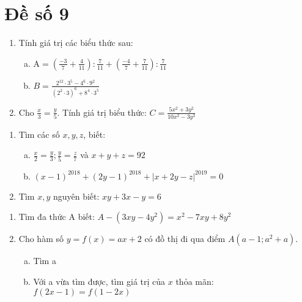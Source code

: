 \onehalfspacing
\section{Đề số 9}

\begin{bt}
	\hfill
	\begin{enumerate}[1.]
		\item Tính giá trị các biểu thức sau:
		\begin{enumerate}[a.]
			\item $\mathrm{A}=\left(\frac{-3}{7}+\frac{4}{11}\right): \frac{7}{11}+\left(\frac{-4}{7}+\frac{7}{11}\right): \frac{7}{11}$
			\item $B=\frac{2^{12} \cdot 3^5-4^6 \cdot 9^2}{\left(2^2 \cdot 3\right)^6+8^4 \cdot 3^5}$
		\end{enumerate}
		\item Cho $\frac{x}{3}=\frac{y}{5}$. Tính giá trị biểu thức: $C=\frac{5 x^2+3 y^2}{10 x^2-3 y^2}$
	\end{enumerate}
	\loigiai{} 
\end{bt}

\begin{bt}
	\hfill
	\begin{enumerate}[1.]
		\item Tìm các số $x, y, z$, biết:
		\begin{enumerate}[a.]
			\item $\frac{x}{2}=\frac{y}{3} ; \frac{y}{5}=\frac{z}{7}$ và $x+y+z=92$
			\item $(x-1)^{2018}+(2 y-1)^{2018}+|x+2 y-z|^{2019}=0$
		\end{enumerate}
		\item Tìm $x, y$ nguyên biết: $x y+3 x-y=6$
	\end{enumerate}
	\loigiai{} 
\end{bt}

\begin{bt}
	\hfill
	\begin{enumerate}[1.] 
		\item Tìm đa thức $\mathrm{A}$ biết: $A-\left(3 x y-4 y^2\right)=x^2-7 x y+8 y^2$
		\item Cho hàm số $y=f(x)=a x+2$ có đồ thị đi qua điểm $A\left(a-1 ; a^2+a\right)$.
		\begin{enumerate}[a.]
			\item Tìm a
			\item Với a vừa tìm được, tìm giá trị của $x$ thỏa mãn: $f(2 x-1)=f(1-2 x)$
		\end{enumerate}
	\end{enumerate}
	\loigiai{} 
\end{bt}

